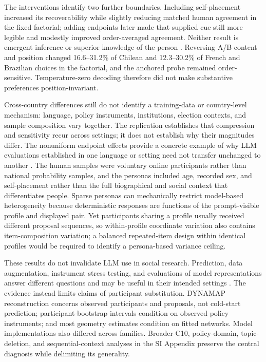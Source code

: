 \documentclass[unnumsec,webpdf,modern,large]{oup-authoring-template}
\begin{document}
The interventions identify two further boundaries. Including self-placement increased its recoverability while slightly reducing matched human agreement in the fixed factorial; adding endpoints later made that supplied cue still more legible and modestly improved order-averaged agreement. Neither result is emergent inference or superior knowledge of the person \citep{Bernardelle2025}. Reversing A/B content and position changed 16.6--31.2\% of Chilean and 12.3--30.2\% of French and Brazilian choices in the factorial, and the anchored probe remained order-sensitive. Temperature-zero decoding therefore did not make substantive preferences position-invariant.

Cross-country differences still do not identify a training-data or country-level mechanism: language, policy instruments, institutions, election contexts, and sample composition vary together. The replication establishes that compression and sensitivity recur across settings; it does not establish why their magnitudes differ. The nonuniform endpoint effects provide a concrete example of why LLM evaluations established in one language or setting need not transfer unchanged to another \citep{Atari2023}. The human samples were voluntary online participants rather than national probability samples, and the personas included age, recorded sex, and self-placement rather than the full biographical and social context that differentiates people. Sparse personas can mechanically restrict model-based heterogeneity because deterministic responses are functions of the prompt-visible profile and displayed pair. Yet participants sharing a profile usually received different proposal sequences, so within-profile coordinate variation also contains item-composition variation; a balanced repeated-item design within identical profiles would be required to identify a persona-based variance ceiling.

These results do not invalidate LLM use in social research. Prediction, data augmentation, instrument stress testing, and evaluations of model representations answer different questions and may be useful in their intended settings \citep{GudinoRosero2024}. The evidence instead limits claims of participant substitution. DYNAMAP reconstruction concerns observed participants and proposals, not cold-start prediction; participant-bootstrap intervals condition on observed policy instruments; and most geometry estimates condition on fitted networks. Model implementations also differed across families. Broader-C10, policy-domain, topic-deletion, and sequential-context analyses in the SI Appendix preserve the central diagnosis while delimiting its generality.
\end{document}
